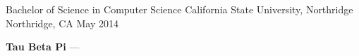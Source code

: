 
\begin{cventries}
  \cventry
    {Bachelor of Science in Computer Science} %
    {California State University, Northridge} %
    {Northridge, CA} %
    {May 2014} %
    {
      \begin{cvitems} %
         \item {\textbf{Tau Beta Pi}  --- }
         \vspace{0.5mm}
      \end{cvitems}
    }
\end{cventries}
